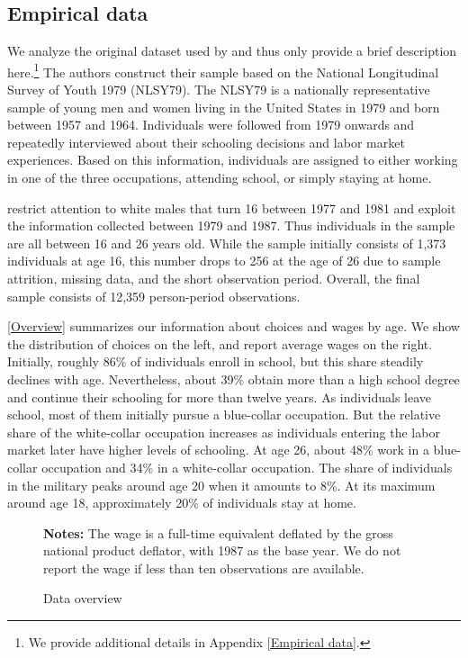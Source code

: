 \subsection{Empirical data}
We analyze the original dataset used by \citet{Keane.1997} and thus only provide a brief description here.\footnote{We provide additional details in Appendix \ref{Empirical data}.} The authors construct their sample based on the National Longitudinal Survey of Youth 1979 (NLSY79). The NLSY79 is a nationally representative sample of young men and women living in the United States in 1979 and born between 1957 and 1964. Individuals were followed from 1979 onwards and repeatedly interviewed about their schooling decisions and labor market experiences. Based on this information, individuals are assigned to either working in one of the three occupations, attending school, or simply staying at home.

\citet{Keane.1997} restrict attention to white males that turn 16 between 1977 and 1981 and exploit the information collected between 1979 and 1987. Thus individuals in the sample are all between 16 and 26 years old. While the sample initially consists of 1,373 individuals at age 16, this number drops to 256 at the age of 26 due to sample attrition, missing data, and the short observation period. Overall, the final sample consists of 12,359 person-period observations.

\autoref{Overview} summarizes our information about choices and wages by age. We show the distribution of choices on the left, and report average wages on the right. Initially, roughly 86\% of individuals enroll in school, but this share steadily declines with age. Nevertheless, about 39\% obtain more than a high school degree and continue their schooling for more than twelve years. As individuals leave school, most of them initially pursue a blue-collar occupation. But the relative share of the white-collar occupation increases as individuals entering the labor market later have higher levels of schooling. At age 26, about 48\% work in a blue-collar occupation and 34\% in a white-collar occupation. The share of individuals in the military peaks around age 20 when it amounts to 8\%. At its maximum around age 18, approximately 20\% of individuals stay at home.

%
\begin{figure}[t!]\centering
\caption{Data overview}\label{Overview}
\hspace{0.3cm}
\begin{center}
\begin{minipage}[t]{0.75\columnwidth}
\item \scriptsize{\textbf{Notes:} The wage is a full-time equivalent deflated by the gross national product deflator, with 1987 as the base year. We do not report the wage if less than ten observations are available.}
\end{minipage}
\end{center}
\end{figure}%
%

